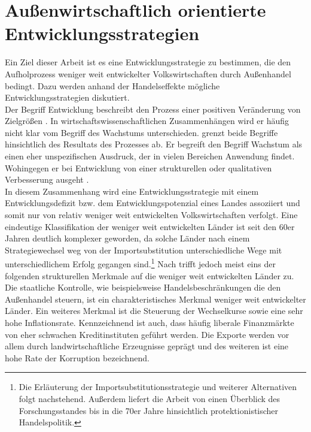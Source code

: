 \chapter{Au{\ss}enwirtschaftlich orientierte Entwicklungsstrategien}\label{Entwicklungsstrategien}

Ein Ziel dieser Arbeit ist es eine Entwicklungsstrategie zu bestimmen, die den Aufholprozess weniger weit entwickelter Volkswirtschaften durch Au{\ss}enhandel bedingt. Dazu werden anhand der Handelseffekte m{\"o}gliche Entwicklungsstrategien diskutiert.\\

Der Begriff Entwicklung beschreibt den Prozess einer positiven Ver{\"a}nderung von Zielgr{\"o}{\ss}en \citep[Kapitel 1]{Wagner.1995}. In wirtschaftswissenschaftlichen Zusammenh{\"a}ngen wird er h{\"a}ufig nicht klar vom Begriff des Wachstums unterschieden. \citet{Findlay.1984} grenzt beide Begriffe hinsichtlich des Resultats des Prozesses ab. Er begreift den Begriff Wachstum als einen eher unspezifischen Ausdruck, der in vielen Bereichen Anwendung findet. Wohingegen er bei Entwicklung von einer strukturellen oder qualitativen Verbesserung ausgeht \citep{Findlay.1984}.\\


In diesem Zusammenhang wird eine Entwicklungsstrategie mit einem Entwicklungsdefizit bzw. dem Entwicklungspotenzial eines Landes assoziiert und somit nur von relativ weniger weit entwickelten Volkswirtschaften verfolgt. Eine eindeutige Klassifikation der weniger weit entwickelten L{\"a}nder ist seit den 60er Jahren deutlich komplexer geworden, da solche L{\"a}nder nach einem Strategiewechsel weg von der Importsubstitution unterschiedliche Wege mit unterschiedlichem Erfolg gegangen sind.\footnote{Die Erl{\"a}uterung der Importsubstitutionsstrategie und weiterer Alternativen folgt nachstehend. Au{\ss}erdem liefert die Arbeit von \citet{Stern.1973} einen {\"U}berblick des Forschungsstandes bis in die 70er Jahre hinsichtlich protektionistischer Handelspolitik.} Nach \citet{Krugman.2015} trifft jedoch meist eins der folgenden strukturellen Merkmale auf die weniger weit entwickelten L{\"a}nder zu. Die staatliche Kontrolle, wie beispielsweise Handelsbeschr{\"a}nkungen die den Au{\ss}enhandel steuern, ist ein charakteristisches Merkmal weniger weit entwickelter L{\"a}nder. Ein weiteres Merkmal ist die Steuerung der Wechselkurse sowie eine sehr hohe Inflationsrate. Kennzeichnend ist auch, dass h{\"a}ufig liberale Finanzm{\"a}rkte von eher schwachen Kreditinstituten gef{\"u}hrt werden. Die Exporte werden vor allem durch landwirtschaftliche Erzeugnisse gepr{\"a}gt und des weiteren ist eine hohe Rate der Korruption bezeichnend.\newline


